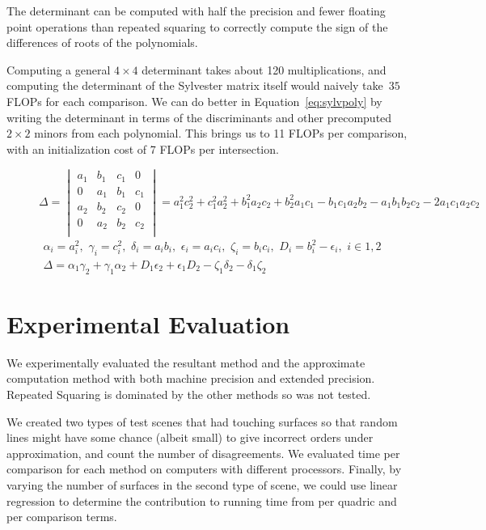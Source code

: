 \documentclass{cccg16}
\begin{document}
The determinant can be computed with half the precision and fewer
floating point operations than repeated squaring to correctly compute
the sign of the differences of roots of the polynomials.

Computing a general $4{\times} 4$ determinant takes about 120
multiplications, and computing the determinant of the Sylvester matrix
itself would naively take~$35$ FLOPs for each comparison.  We can do
better in Equation~\ref{eq:sylvpoly} by writing the determinant in
terms of the discriminants and other precomputed $2{\times} 2$ minors
from each polynomial.  This brings us to 11 FLOPs per comparison, with
an initialization cost of 7 FLOPs per intersection.

\begin{figure}
  \begin{equation*}
    \Delta=\begin{vmatrix}
    a_1 & b_1 & c_1 & 0\\
    0 & a_1 & b_1 & c_1\\
    a_2 & b_2 & c_2 & 0\\
    0 & a_2 & b_2 & c_2\\
    \end{vmatrix}=
    a_1^2 c_2^2 + c_1^2 a_2^2 + b_1^2 a_2 c_2 + b_2^2 a_1 c_1 -
    b_1 c_1 a_2 b_2 - a_1 b_1 b_2 c_2 - 2 a_1 c_1 a_2 c_2
  \end{equation*}
  \begin{align}
    \alpha_i=a_i^2,\,\, \gamma_i=c_i^2,\,\,
    \delta_i=a_i b_i,\,\, \epsilon_i=a_i c_i,\,\, \zeta_i=b_i c_i,\,\,
    D_i=b_i^2-\epsilon_i,\,\,
    i\in {1, 2}\\
    \Delta = \alpha_1 \gamma_2 + \gamma_1 \alpha_2 +
    D_1 \epsilon_2 + \epsilon_1 D_2 - \zeta_1 \delta_2 -
    \delta_1 \zeta_2
  \label{eq:sylvpoly}
  \end{align}
\end{figure}

\section{Experimental Evaluation}
We experimentally evaluated the resultant method and the approximate
computation method with both machine precision and extended precision.
Repeated Squaring is dominated by the other methods so was not tested.

We created two types of test scenes that had touching surfaces so that
random lines might have some chance (albeit small) to give incorrect
orders under approximation, and count the number of disagreements.  We
evaluated time per comparison for each method on computers with
different processors.  Finally, by varying the number of surfaces in
the second type of scene, we could use linear regression to determine
the contribution to running time from per quadric and per comparison
terms.
 
\end{document}
